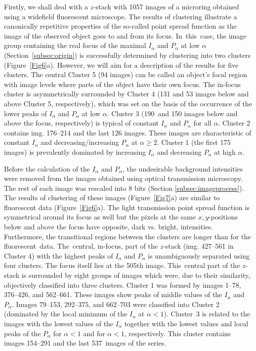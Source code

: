 \documentclass[entropy,article,accept,moreauthors,pdftex,10pt,a4paper]{mdpi}
\begin{document}
Firstly, we shall deal with a $z$-stack with 1057 images of a microring obtained using a widefield fluorescent microscope. The results of clustering illustrate a canonically repetitive properties of the so-called point spread function as the image of the observed object goes to and from its focus. In~this~case, the image group containing the real focus of the maximal $I_\alpha$ and $P_\alpha$ at low $\alpha$ (Section~\ref{subsec:origin}) is successfully determined by clustering into two clusters (Figure~\ref{Fig6}a). However, we will aim for a description of the results for five clusters. The central Cluster 5 (94 images) can be called an object's focal region with image levels where parts of the object have their own focus. The in-focus cluster is asymmetrically surrounded by Cluster 4 (131 and 53 images below and above Cluster 5, respectively), which was set on the basis of the occurrence of the lower peaks of $I_\alpha$ and $P_\alpha$ at low $\alpha$. Cluster 3 (190~and 150 images below and above the focus, respectively) is typical of constant $I_\alpha$ and $P_\alpha$ for all $\alpha$. Cluster 2 contains img. 176--214 and the last 126 images. These images are characteristic of constant $I_\alpha$ and decreasing/increasing $P_\alpha$ at $\alpha \geq 2$. Cluster 1 (the first 175 images) is prevalently dominated by increasing $I_\alpha$ and decreasing $P_\alpha$ at high $\alpha$.

Before the calculation of the $I_\alpha$ and $P_\alpha$, the undesirable background intensities were removed from the images obtained using optical transmission microscopy. The rest of each image was rescaled into 8 bits (Section \ref{subsec:imageprocess}). The results of clustering of these images (Figure~\ref{Fig7}a) are similar to fluorescent data (Figure~\ref{Fig6}a). The light transmission point spread function is symmetrical around its focus as well but the pixels at the same $x,y$-positions below and above the focus have opposite, dark vs. bright, intensities. Furthermore, the transitional regions between the clusters are longer than for the fluorescent~data. The~central, in-focus, part of the $z$-stack (img. 427--561 in Cluster 4) with the highest peaks of $I_\alpha$ and $P_\alpha$ is unambiguously separated using four clusters. The focus itself lies at the 505th image. This~central part of the $z$-stack is surrounded by eight groups of images which were, due to their similarity, objectively classified into three clusters. Cluster 1 was formed by images 1--78, 376--426, and 562--661. These images show peaks of middle values of the $I_\alpha$ and $P_\alpha$. Images 79--153, 292--375, and 662--703 were classified into Cluster 2 (dominated by the local minimum of the $I_\alpha$ at $\alpha < 1$). Cluster~3 is related to the images with the lowest values of the $I_\alpha$ together with the lowest values and local peaks of the $P_\alpha$ for $\alpha < 1$ and for $\alpha < 1$, respectively. This cluster contains images 154--291 and the last 537~images of the series.
\end{document}
